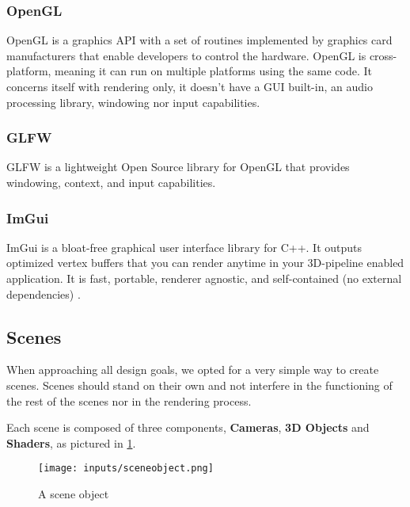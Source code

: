 \documentclass[cic,tc,english]{iiufrgs}
\begin{document}
\subsubsection{OpenGL}
OpenGL is a graphics API with a set of routines implemented by graphics card manufacturers that enable developers to control the hardware. OpenGL is cross-platform, meaning it can run on multiple platforms using the same code. It concerns itself with rendering only, it doesn't have a GUI built-in, an audio processing library, windowing nor input capabilities.

\subsubsection{GLFW}
GLFW is a lightweight Open Source library for OpenGL that provides windowing, context, and input capabilities.

\subsubsection{ImGui}
ImGui is a bloat-free graphical user interface library for C++. It outputs optimized vertex buffers that you can render anytime in your 3D-pipeline enabled application. It is fast, portable, renderer agnostic, and self-contained (no external dependencies) \cite{Imgui2016}.

\subsection{Scenes}
When approaching all design goals, we opted for a very simple way to create scenes. Scenes should stand on their own and not interfere in the functioning of the rest of the scenes nor in the rendering process.

Each scene is composed of three components, \textbf{Cameras}, \textbf{3D Objects} and \textbf{Shaders}, as pictured in \cref{sceneobjects}.
\begin{figure}[hbt!]
    \caption{A scene object}
    \begin{center}
        \texttt{[image: inputs/sceneobject.png]}
    \end{center}
    \label{sceneobjects}
\end{figure}
\end{document}
